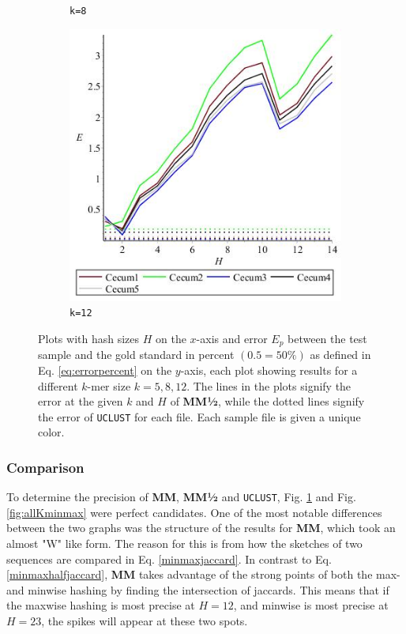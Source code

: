 \documentclass[../../main.tex]{subfiles}
\begin{document}
\begin{figure}[H]
\begin{subfigure}[b]{.5\textwidth}
\caption{\texttt{k=8}}
\end{subfigure}
\begin{subfigure}[b]{.5\textwidth}
\includegraphics[width=\textwidth]{precision/minmaxhalf/k12cecum}
\caption{\texttt{k=12}}
\end{subfigure}
\caption{Plots with hash sizes $H$ on the $x$-axis and error $E_p$ between the test sample and the gold standard in percent $(0.5 = 50\%)$ as defined in Eq. \ref{eq:errorpercent} on the $y$-axis, each plot showing results for a different $k$-mer size $k=5,8,12$. The lines in the plots signify the error at the given $k$ and $H$ of {\bf MM½}, while the dotted lines signify the error of \texttt{UCLUST} for each file. Each sample file is given a unique color.}
\label{fig:allKminmaxhalf}
\end{figure}

\subsubsection{Comparison}
To determine the precision of {\bf MM}, {\bf MM½} and \texttt{UCLUST}, Fig. \ref{fig:allKminmaxhalf} and Fig. \ref{fig:allKminmax} were perfect candidates. One of the most notable differences between the two graphs was the structure of the results for {\bf MM}, which took an almost "W" like form. The reason for this is from how the sketches of two sequences are compared in Eq. \ref{minmaxjaccard}. In contrast to Eq. \ref{minmaxhalfjaccard}, {\bf MM} takes advantage of the strong points of both the max- and minwise hashing by finding the intersection of jaccards. This means that if the maxwise hashing is most precise at $H=12$, and minwise is most precise at $H=23$, the spikes will appear at these two spots.\\
\end{document}
